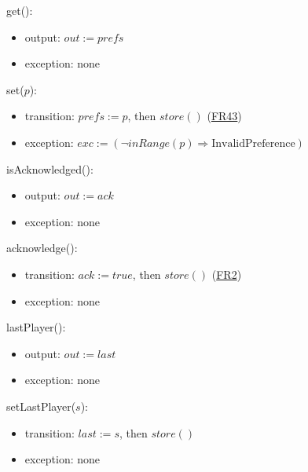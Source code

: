\documentclass[10pt, titlepage]{article}
\newcommand{\srsurl}{https://team-hindsight.github.io/ophthamology-game/SRS/SRS.pdf}
\newcommand{\srsitemref}[2]{\href{\srsurl\#nameddest=#1}{#2}}
\newcommand{\T}[1]{\mathit{#1}}          %
\newcommand{\out}{\mathit{out}}
\newcommand{\exc}{\mathit{exc}}
\newcommand{\true}{\mathit{true}}
\begin{document}
\begin{samepage}
\noindent get():
\begin{itemize}
\item output: $\out := \T{prefs}$
\item exception: none
\end{itemize}
\end{samepage}
\par\pagebreak[0]

\begin{samepage}
\noindent set($p$):
\begin{itemize}
\item transition: $\T{prefs} := p$, then $\T{store}()$ (\srsitemref{FR_Preferences}{FR43})
\item exception: $\exc := (\neg\T{inRange}(p) \Rightarrow \text{InvalidPreference})$
\end{itemize}
\end{samepage}
\par\pagebreak[0]

\begin{samepage}
\noindent isAcknowledged():
\begin{itemize}
\item output: $\out := \T{ack}$
\item exception: none
\end{itemize}
\end{samepage}
\par\pagebreak[0]

\begin{samepage}
\noindent acknowledge():
\begin{itemize}
\item transition: $\T{ack} := \true$, then $\T{store}()$ (\srsitemref{FR_RecordAck}{FR2})
\item exception: none
\end{itemize}
\end{samepage}
\par\pagebreak[0]

\begin{samepage}
\noindent lastPlayer():
\begin{itemize}
\item output: $\out := \T{last}$
\item exception: none
\end{itemize}
\end{samepage}
\par\pagebreak[0]

\begin{samepage}
\noindent setLastPlayer($s$):
\begin{itemize}
\item transition: $\T{last} := s$, then $\T{store}()$
\item exception: none
\end{itemize}
\end{samepage}
\par\pagebreak[0]
\end{document}
